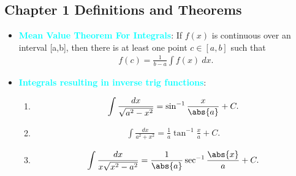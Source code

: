 \documentclass{report}
\begin{document}
    \subsection{Chapter 1 Definitions and Theorems}
    \bigbreak \noindent 
    \begin{itemize}
        \item \textbf{\textcolor{cyan}{Mean Value Theorem For Integrals}}: If  $f(x)$ is continuous over an interval  [a,b], then there is at least one point  $c\in[a,b]$ such that 
            \begin{align*}
                f(c) = \frac{1}{b-a}\int f(x)\ dx
            .\end{align*}
        \item \textbf{\textcolor{cyan}{Integrals resulting in inverse trig functions}}:
            \begin{enumerate}
                \item \begin{align*}
                        \int \frac{dx}{\sqrt{a^{2}-x^{2}}} = \sin^{-1}{\frac{x}{\abs{a}}} + C
                    .\end{align*}
                \item \begin{align*}
                        \int \frac{dx}{a^{2}+x^{2}} = \frac{1}{a}\tan^{-1}{\frac{x}{a}} + C
                    .\end{align*}
                \item \begin{align*}
                        \int \frac{dx}{x\sqrt{x^{2}-a^{2}}} = \frac{1}{\abs{a}}\sec^{-1}{\frac{\abs{x}}{a}} + C
                    .\end{align*}
            \end{enumerate}
    \end{itemize}
\end{document}
